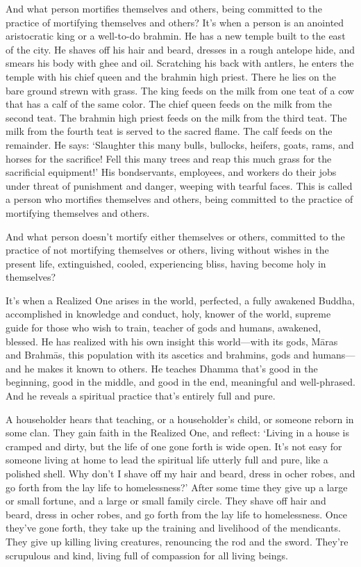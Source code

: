 \documentclass[12pt,openany]{book}%
\begin{document}
And what person mortifies themselves and others, being committed to the practice of mortifying themselves and others? It’s when a person is an anointed aristocratic king or a well-to-do brahmin. He has a new temple built to the east of the city. He shaves off his hair and beard, dresses in a rough antelope hide, and smears his body with ghee and oil. Scratching his back with antlers, he enters the temple with his chief queen and the brahmin high priest. There he lies on the bare ground strewn with grass. The king feeds on the milk from one teat of a cow that has a calf of the same color. The chief queen feeds on the milk from the second teat. The brahmin high priest feeds on the milk from the third teat. The milk from the fourth teat is served to the sacred flame. The calf feeds on the remainder. He says: ‘Slaughter this many bulls, bullocks, heifers, goats, rams, and horses for the sacrifice! Fell this many trees and reap this much grass for the sacrificial equipment!’ His bondservants, employees, and workers do their jobs under threat of punishment and danger, weeping with tearful faces. This is called a person who mortifies themselves and others, being committed to the practice of mortifying themselves and others. 

And what person doesn’t mortify either themselves or others, committed to the practice of not mortifying themselves or others, living without wishes in the present life, extinguished, cooled, experiencing bliss, having become holy in themselves? 

It’s when a Realized One arises in the world, perfected, a fully awakened Buddha, accomplished in knowledge and conduct, holy, knower of the world, supreme guide for those who wish to train, teacher of gods and humans, awakened, blessed. He has realized with his own insight this world—with its gods, \textsanskrit{Māras} and \textsanskrit{Brahmās}, this population with its ascetics and brahmins, gods and humans—and he makes it known to others. He teaches Dhamma that’s good in the beginning, good in the middle, and good in the end, meaningful and well-phrased. And he reveals a spiritual practice that’s entirely full and pure. 

A householder hears that teaching, or a householder’s child, or someone reborn in some clan. They gain faith in the Realized One, and reflect: ‘Living in a house is cramped and dirty, but the life of one gone forth is wide open. It’s not easy for someone living at home to lead the spiritual life utterly full and pure, like a polished shell. Why don’t I shave off my hair and beard, dress in ocher robes, and go forth from the lay life to homelessness?’ After some time they give up a large or small fortune, and a large or small family circle. They shave off hair and beard, dress in ocher robes, and go forth from the lay life to homelessness. Once they’ve gone forth, they take up the training and livelihood of the mendicants. They give up killing living creatures, renouncing the rod and the sword. They’re scrupulous and kind, living full of compassion for all living beings. 
\end{document}
